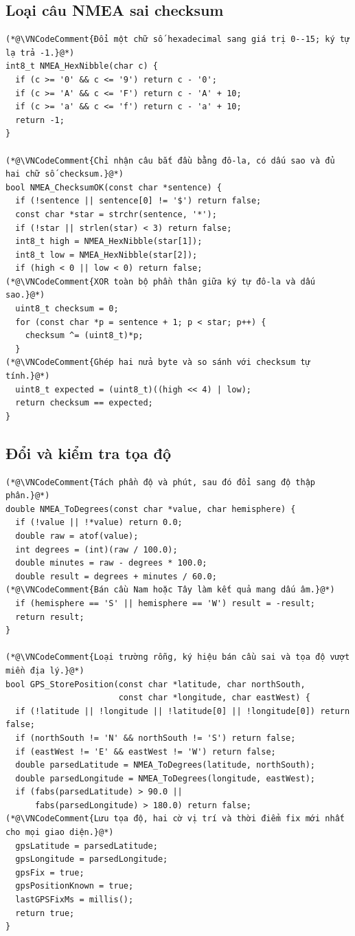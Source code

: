 \documentclass[12pt]{article}
\begin{document}
\Needspace{0.28\textheight}
\subsection{Loại câu NMEA sai checksum}
\begin{lstlisting}[style=firmware,caption={Hàm kiểm tra đầy đủ checksum NMEA}]
(*@\VNCodeComment{Đổi một chữ số hexadecimal sang giá trị 0--15; ký tự lạ trả -1.}@*)
int8_t NMEA_HexNibble(char c) {
  if (c >= '0' && c <= '9') return c - '0';
  if (c >= 'A' && c <= 'F') return c - 'A' + 10;
  if (c >= 'a' && c <= 'f') return c - 'a' + 10;
  return -1;
}

(*@\VNCodeComment{Chỉ nhận câu bắt đầu bằng đô-la, có dấu sao và đủ hai chữ số checksum.}@*)
bool NMEA_ChecksumOK(const char *sentence) {
  if (!sentence || sentence[0] != '$') return false;
  const char *star = strchr(sentence, '*');
  if (!star || strlen(star) < 3) return false;
  int8_t high = NMEA_HexNibble(star[1]);
  int8_t low = NMEA_HexNibble(star[2]);
  if (high < 0 || low < 0) return false;
(*@\VNCodeComment{XOR toàn bộ phần thân giữa ký tự đô-la và dấu sao.}@*)
  uint8_t checksum = 0;
  for (const char *p = sentence + 1; p < star; p++) {
    checksum ^= (uint8_t)*p;
  }
(*@\VNCodeComment{Ghép hai nửa byte và so sánh với checksum tự tính.}@*)
  uint8_t expected = (uint8_t)((high << 4) | low);
  return checksum == expected;
}
\end{lstlisting}

\subsection{Đổi và kiểm tra tọa độ}
\begin{lstlisting}[style=firmware,caption={Đổi tọa độ NMEA và chỉ lưu giá trị hợp lệ}]
(*@\VNCodeComment{Tách phần độ và phút, sau đó đổi sang độ thập phân.}@*)
double NMEA_ToDegrees(const char *value, char hemisphere) {
  if (!value || !*value) return 0.0;
  double raw = atof(value);
  int degrees = (int)(raw / 100.0);
  double minutes = raw - degrees * 100.0;
  double result = degrees + minutes / 60.0;
(*@\VNCodeComment{Bán cầu Nam hoặc Tây làm kết quả mang dấu âm.}@*)
  if (hemisphere == 'S' || hemisphere == 'W') result = -result;
  return result;
}

(*@\VNCodeComment{Loại trường rỗng, ký hiệu bán cầu sai và tọa độ vượt miền địa lý.}@*)
bool GPS_StorePosition(const char *latitude, char northSouth,
                       const char *longitude, char eastWest) {
  if (!latitude || !longitude || !latitude[0] || !longitude[0]) return false;
  if (northSouth != 'N' && northSouth != 'S') return false;
  if (eastWest != 'E' && eastWest != 'W') return false;
  double parsedLatitude = NMEA_ToDegrees(latitude, northSouth);
  double parsedLongitude = NMEA_ToDegrees(longitude, eastWest);
  if (fabs(parsedLatitude) > 90.0 ||
      fabs(parsedLongitude) > 180.0) return false;
(*@\VNCodeComment{Lưu tọa độ, hai cờ vị trí và thời điểm fix mới nhất cho mọi giao diện.}@*)
  gpsLatitude = parsedLatitude;
  gpsLongitude = parsedLongitude;
  gpsFix = true;
  gpsPositionKnown = true;
  lastGPSFixMs = millis();
  return true;
}
\end{lstlisting}
\end{document}

